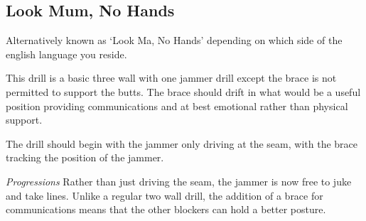 \subsection*{Look Mum, No Hands}
\label{drill:three_wall/no_hands}

Alternatively known as `Look Ma, No Hands' depending on which side of the english language you reside.

This drill is a basic three wall with one jammer drill except the brace is not permitted to support the butts. 
The brace should drift in what would be a useful position providing communications and at best emotional rather than physical support.  

The drill should begin with the jammer only driving at the seam, with the brace tracking the position of the jammer.


{\it Progressions}
Rather than just driving the seam, the jammer is now free to juke and take lines. 
Unlike a regular two wall drill, the addition of a brace for communications means that the other blockers can hold a better posture. 

